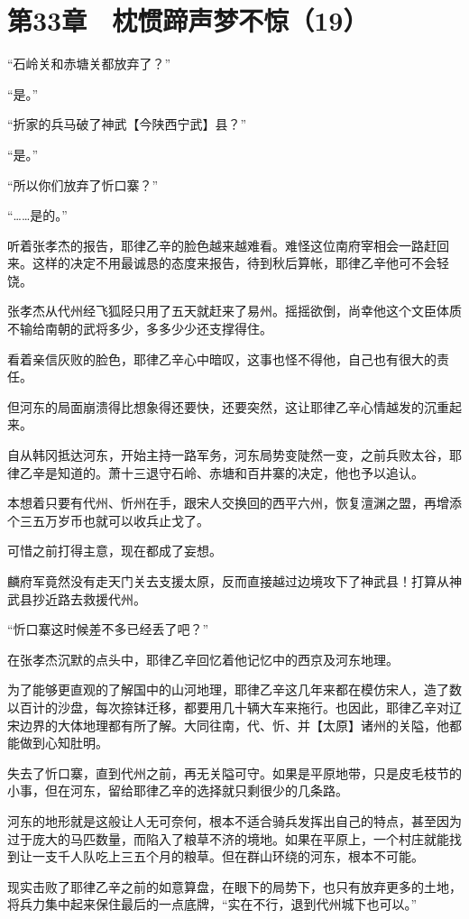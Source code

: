 \section{第33章　枕惯蹄声梦不惊（19）}

“石岭关和赤塘关都放弃了？”

“是。”

“折家的兵马破了神武【今陕西宁武】县？”

“是。”

“所以你们放弃了忻口寨？”

“……是的。”

听着张孝杰的报告，耶律乙辛的脸色越来越难看。难怪这位南府宰相会一路赶回来。这样的决定不用最诚恳的态度来报告，待到秋后算帐，耶律乙辛他可不会轻饶。

张孝杰从代州经飞狐陉只用了五天就赶来了易州。摇摇欲倒，尚幸他这个文臣体质不输给南朝的武将多少，多多少少还支撑得住。

看着亲信灰败的脸色，耶律乙辛心中暗叹，这事也怪不得他，自己也有很大的责任。

但河东的局面崩溃得比想象得还要快，还要突然，这让耶律乙辛心情越发的沉重起来。

自从韩冈抵达河东，开始主持一路军务，河东局势变陡然一变，之前兵败太谷，耶律乙辛是知道的。萧十三退守石岭、赤塘和百井寨的决定，他也予以追认。

本想着只要有代州、忻州在手，跟宋人交换回的西平六州，恢复澶渊之盟，再增添个三五万岁币也就可以收兵止戈了。

可惜之前打得主意，现在都成了妄想。

麟府军竟然没有走天门关去支援太原，反而直接越过边境攻下了神武县！打算从神武县抄近路去救援代州。

“忻口寨这时候差不多已经丢了吧？”

在张孝杰沉默的点头中，耶律乙辛回忆着他记忆中的西京及河东地理。

为了能够更直观的了解国中的山河地理，耶律乙辛这几年来都在模仿宋人，造了数以百计的沙盘，每次捺钵迁移，都要用几十辆大车来拖行。也因此，耶律乙辛对辽宋边界的大体地理都有所了解。大同往南，代、忻、并【太原】诸州的关隘，他都能做到心知肚明。

失去了忻口寨，直到代州之前，再无关隘可守。如果是平原地带，只是皮毛枝节的小事，但在河东，留给耶律乙辛的选择就只剩很少的几条路。

河东的地形就是这般让人无可奈何，根本不适合骑兵发挥出自己的特点，甚至因为过于庞大的马匹数量，而陷入了粮草不济的境地。如果在平原上，一个村庄就能找到让一支千人队吃上三五个月的粮草。但在群山环绕的河东，根本不可能。

现实击败了耶律乙辛之前的如意算盘，在眼下的局势下，也只有放弃更多的土地，将兵力集中起来保住最后的一点底牌，“实在不行，退到代州城下也可以。”

